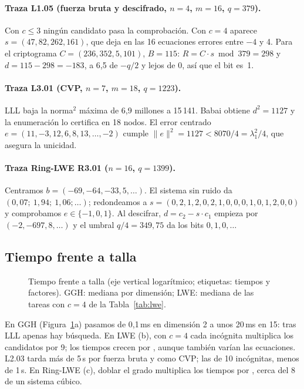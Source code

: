 \paragraph{Traza L1.05 (fuerza bruta y descifrado, $n=4$, $m=16$, $q=379$).}
Con $c\le3$ ningún candidato pasa la comprobación. Con $c=4$ aparece $s=(47,82,262,161)$, que deja
en las 16 ecuaciones errores entre $-4$ y 4. Para el criptograma $C=(236,352,5,101)$, $B=115$:
$R=C\cdot s\bmod 379=298$ y $d=115-298=-183$, a 6{,}5 de $-q/2$ y lejos de 0, así que el bit es~1.

\paragraph{Traza L3.01 (CVP, $n=7$, $m=18$, $q=1223$).}
LLL baja la norma$^2$ máxima de 6{,}9 millones a 15\,141. Babai obtiene $d^2=1127$ y la enumeración
lo certifica en 18 nodos. El error centrado $e=(11,-3,12,6,8,13,\dots,-2)$ cumple
$\|e\|^2=1127<8070/4=\lambda_1^2/4$, que asegura la unicidad.

\paragraph{Traza Ring-LWE R3.01 ($n=16$, $q=1399$).}
Centramos $b=(-69,-64,-33,5,\dots)$. El sistema sin ruido da $(0{,}07;\ 1{,}94;\ 1{,}06;\dots)$;
redondeamos a $s=(0,2,1,2,0,2,1,0,0,0,1,0,1,2,0,0)$ y comprobamos $e\in\{-1,0,1\}$.
Al descifrar, $d=c_2-s\cdot c_1$ empieza por $(-2,-697,8,\dots)$ y el umbral $q/4=349{,}75$
da los bits $0,1,0,\dots$

\subsection{Tiempo frente a talla}
\begin{figure}[H]
\centering

\caption{Tiempo frente a talla (eje vertical logarítmico; etiquetas: tiempos y factores). GGH: mediana por
dimensión; LWE: mediana de las tareas con $c=4$ de la Tabla~\ref{tab:lwe}.}
\label{fig:tiempos}
\end{figure}
En GGH (Figura~\ref{fig:tiempos}a) pasamos de 0{,}1\,ms en dimensión 2 a unos 20\,ms en 15:
tras LLL apenas hay búsqueda. En LWE (b), con $c=4$ cada incógnita multiplica los candidatos por 9;
los tiempos crecen por \TextoFactoresLWE, aunque también varían las ecuaciones.
L2.03 tarda más de 5\,s por fuerza bruta y \TiempoCVPLdosTres{} como CVP; las de 10 incógnitas, menos de 1\,s. En Ring-LWE (c), doblar el grado multiplica los tiempos por
\TextoFactoresRing, cerca del 8 de un sistema cúbico.
